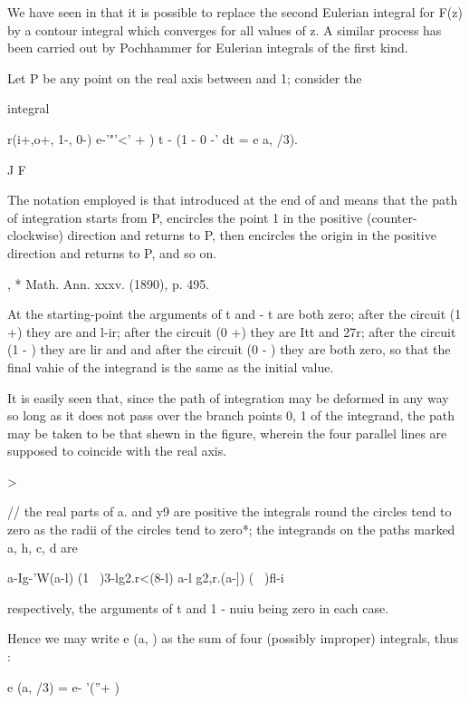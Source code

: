 

We have seen in  that it is possible to replace the second
Eulerian integral for F(z) by a contour integral which converges for
all values of z. A similar process has been carried out by Pochhammer
for Eulerian integrals of the first kind.

Let P be any point on the real axis between and 1; consider the

integral

r(i+,o+, 1-, 0-) e-'"'<' + ) t - (1 - 0 -' dt = e a, /3).

J F

The notation employed is that introduced at the end of  and
means that the path of integration starts from P, encircles the point
1 in the positive (counter-clockwise) direction and returns to P, then
encircles the origin in the positive direction and returns to P, and
so on.

, * Math. Ann. xxxv. (1890), p. 495.

%
%

At the starting-point the arguments of t and - t are both zero; after
the circuit (1 +) they are and l-ir; after the circuit (0 +) they are
Itt and 27r; after the circuit (1 - ) they are lir and and after the
circuit (0 - ) they are both zero, so that the final vahie of the
integrand is the same as the initial value.

It is easily seen that, since the path of integration may be deformed
in any way so long as it does not pass over the branch points 0, 1 of
the integrand, the path may be taken to be that shewn in the figure,
wherein the four parallel lines are supposed to coincide with the real
axis.

>

// the real parts of a. and y9 are positive the integrals round the
circles tend to zero as the radii of the circles tend to zero*; the
integrands on the paths marked a, h, c, d are

 a-Ig-'W(a-l) (1 \ )3-lg2.r<(8-l) a-l g2,r.(a-]) ( \ )fl-i

respectively, the arguments of t and 1 - nuiu being zero in each case.

Hence we may write e (a, ) as the sum of four (possibly improper)
integrals, thus :

e (a, /3) = e- '(''+ )

